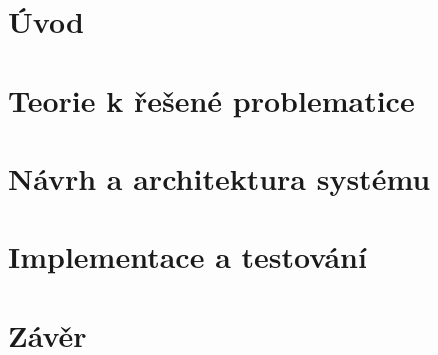 \documentclass[12pt,a4paper,oneside]{article}
\begin{document}
\tableofcontents

\newpage
\section{Úvod}

\clearpage
\section{Teorie k řešené problematice}




\clearpage
\section{Návrh a architektura systému}


\newpage

\newpage


\clearpage
\section{Implementace a testování}\label{sec:implementace}


\section{Závěr}
\end{document}
